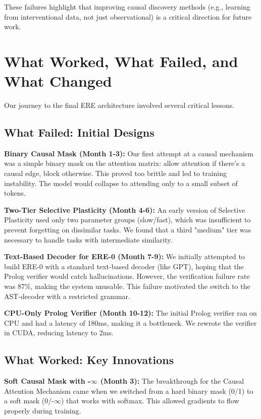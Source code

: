 \documentclass{article}
\begin{document}
These failures highlight that improving causal discovery methods (e.g., learning from interventional data, not just observational) is a critical direction for future work.

\section{What Worked, What Failed, and What Changed}

Our journey to the final ERE architecture involved several critical lessons.

\subsection{What Failed: Initial Designs}

\textbf{Binary Causal Mask (Month 1-3):} Our first attempt at a causal mechanism was a simple binary mask on the attention matrix: allow attention if there's a causal edge, block otherwise. This proved too brittle and led to training instability. The model would collapse to attending only to a small subset of tokens.

\textbf{Two-Tier Selective Plasticity (Month 4-6):} An early version of Selective Plasticity used only two parameter groups (slow/fast), which was insufficient to prevent forgetting on dissimilar tasks. We found that a third "medium" tier was necessary to handle tasks with intermediate similarity.

\textbf{Text-Based Decoder for ERE-0 (Month 7-9):} We initially attempted to build ERE-0 with a standard text-based decoder (like GPT), hoping that the Prolog verifier would catch hallucinations. However, the verification failure rate was 87\%, making the system unusable. This failure motivated the switch to the AST-decoder with a restricted grammar.

\textbf{CPU-Only Prolog Verifier (Month 10-12):} The initial Prolog verifier ran on CPU and had a latency of 180ms, making it a bottleneck. We rewrote the verifier in CUDA, reducing latency to 2ms.

\subsection{What Worked: Key Innovations}

\textbf{Soft Causal Mask with -$\infty$ (Month 3):} The breakthrough for the Causal Attention Mechanism came when we switched from a hard binary mask (0/1) to a soft mask (0/-$\infty$) that works with softmax. This allowed gradients to flow properly during training.
\end{document}
